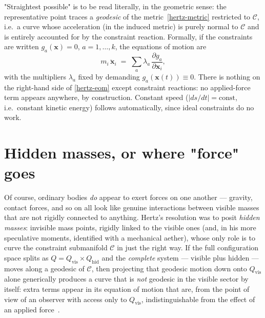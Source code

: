 "Straightest possible" is to be read literally, in the geometric
sense: the representative point traces a \emph{geodesic} of the
metric~\eqref{hertz-metric} restricted to $\mathcal C$, i.e.\ a
curve whose acceleration (in the induced metric) is purely normal to
$\mathcal C$ and is entirely accounted for by the constraint
reaction. Formally, if the constraints are written $g_a(\mathbf
x)=0$, $a=1,\dots,k$, the equations of motion are
\begin{equation}
  m_i\,\ddot{\mathbf x}_i \;=\; \sum_a \lambda_a\,
  \frac{\partial g_a}{\partial \mathbf x_i},
  \label{hertz-eom}
\end{equation}
with the multipliers $\lambda_a$ fixed by demanding $g_a(\mathbf
x(t))\equiv 0$. There is nothing on the right-hand side of
\eqref{hertz-eom} except constraint reactions: no applied-force
term appears anywhere, by construction. Constant speed
($|ds/dt|=\mathrm{const}$, i.e.\ constant kinetic energy) follows
automatically, since ideal constraints do no work.

\section{Hidden masses, or where "force" goes}

Of course, ordinary bodies \emph{do} appear to exert forces on one
another --- gravity, contact forces, and so on all look like genuine
interactions between visible masses that are not rigidly connected
to anything. Hertz's resolution was to posit \emph{hidden masses}:
invisible mass points, rigidly linked to the visible ones (and, in
his more speculative moments, identified with a mechanical
aether), whose only role is to curve the constraint submanifold
$\mathcal C$ in just the right way. If the full configuration space
splits as $Q = Q_{\mathrm{vis}}\times Q_{\mathrm{hid}}$ and the
\emph{complete} system --- visible plus hidden --- moves along a
geodesic of $\mathcal C$, then projecting that geodesic motion down
onto $Q_{\mathrm{vis}}$ alone generically produces a curve that is
\emph{not} geodesic in the visible sector by itself: extra terms
appear in its equation of motion that are, from the point of view of
an observer with access only to $Q_{\mathrm{vis}}$, indistinguishable
from the effect of an applied force~\cite{hertz}.

